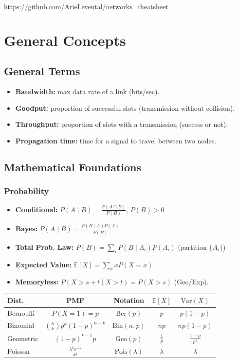 \url{https://github.com/ArieLevental/networks_cheatsheet}
\section{General Concepts}
\subsection{General Terms}
\begin{itemize}
    \item \textbf{Bandwidth:} max data rate of a link (bits/sec).
    \item \textbf{Goodput:} proportion of successful slots (transmission without collision).
    \item \textbf{Throughput:} proportion of slots with a transmission (success or not).
    \item \textbf{Propagation time:} time for a signal to travel between two nodes.
\end{itemize}

\subsection{Mathematical Foundations}
\subsubsection{Probability}
\begin{itemize}
    \item \textbf{Conditional:} $P(A\mid B)=\frac{P(A\cap B)}{P(B)}$, $P(B)>0$
    \item \textbf{Bayes:} $P(A\mid B)=\frac{P(B\mid A)P(A)}{P(B)}$
    \item \textbf{Total Prob. Law:} $P(B)=\sum_i P(B\mid A_i)P(A_i)$ (partition $\{A_i\}$)
    \item \textbf{Expected Value:} $\mathbb{E}[X]=\sum_x xP(X=x)$
    \item \textbf{Memoryless:} $P(X>s+t\mid X>t)=P(X>s)$ (Geo/Exp).
\end{itemize}

\begin{center}
    \renewcommand{\arraystretch}{1.15}
    \setlength{\tabcolsep}{3pt}
    \begin{tabular}{l|c|c|c|c}
        \textbf{Dist.} & \textbf{PMF} & \textbf{Notation} & $\mathbb{E}[X]$ & $\mathrm{Var}(X)$ \\
        \hline
        Bernoulli & $P(X=1)=p$ & $\mathrm{Ber}(p)$ & $p$ & $p(1-p)$ \\
        Binomial & $\binom{n}{k}p^k(1-p)^{n-k}$ & $\mathrm{Bin}(n,p)$ & $np$ & $np(1-p)$ \\
        Geometric & $(1-p)^{k-1}p$ & $\mathrm{Geo}(p)$ & $\frac{1}{p}$ & $\frac{1-p}{p^2}$ \\
        Poisson & $\frac{\lambda^k e^{-\lambda}}{k!}$ & $\mathrm{Pois}(\lambda)$ & $\lambda$ & $\lambda$ \\
    \end{tabular}
\end{center}

